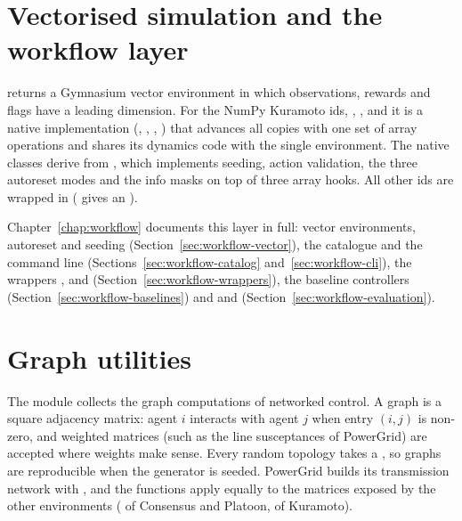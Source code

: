 \section{Vectorised simulation and the workflow layer}\label{sec:envlib-vector}

 returns a Gymnasium vector environment in which
observations, rewards and flags have a leading  dimension. For
the NumPy Kuramoto ids, , ,
 and  it is a native implementation
(, ,
, ) that advances all copies
with one set of array operations and shares its dynamics code with the single
environment. The native classes derive from
, which implements seeding, action
validation, the three autoreset modes and the info masks on top of three
array hooks. All other ids are wrapped in 
( gives an ).

Chapter~\ref{chap:workflow} documents this layer in full: vector environments,
autoreset and seeding (Section~\ref{sec:workflow-vector}), the catalogue and
the command line (Sections~\ref{sec:workflow-catalog}
and~\ref{sec:workflow-cli}), the wrappers ,
 and 
(Section~\ref{sec:workflow-wrappers}), the baseline controllers
(Section~\ref{sec:workflow-baselines}) and  and 
(Section~\ref{sec:workflow-evaluation}).

\section{Graph utilities}\label{sec:envlib-graphs}

The module  collects the graph computations of
networked control. A graph is a square adjacency matrix: agent $i$ interacts
with agent $j$ when entry $(i, j)$ is non-zero, and weighted matrices (such as
the line susceptances of PowerGrid) are accepted where weights make sense.
Every random topology takes a , so graphs are
reproducible when the generator is seeded. PowerGrid builds its transmission
network with , and the functions apply equally to the
matrices exposed by the other environments ( of Consensus and
Platoon,  of Kuramoto).


